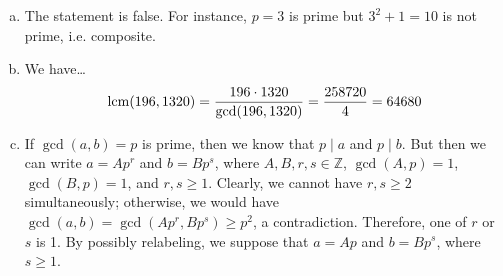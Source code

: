 \documentclass[11pt,letterpaper]{article}
\begin{document}
\sol 
\begin{enumerate}[(a)]
\item The statement is false. For instance, $p= 3$ is prime but $3^2 + 1= 10$ is not prime, i.e. composite. \pspace

\item We have\dots
	\[
	\operatorname{lcm}(196, 1320)= \dfrac{196 \cdot 1320}{\gcd(196, 1320)}= \dfrac{258720}{4}= 64680
	\] \pspace

\item If $\gcd(a, b)= p$ is prime, then we know that $p \mid a$ and $p \mid b$. But then we can write $a= Ap^r$ and $b= Bp^s$, where $A, B, r, s \in \mathbb{Z}$, $\gcd(A, p)= 1$, $\gcd(B, p)= 1$, and $r, s \geq 1$. Clearly, we cannot have $r, s \geq 2$ simultaneously; otherwise, we would have $\gcd(a, b)= \gcd(Ap^r, Bp^s) \geq p^2$, a contradiction. Therefore, one of $r$ or $s$ is 1. By possibly relabeling, we suppose that $a= Ap$ and $b= Bp^s$, where $s \geq 1$. \pspace
\end{enumerate}
\end{document}
